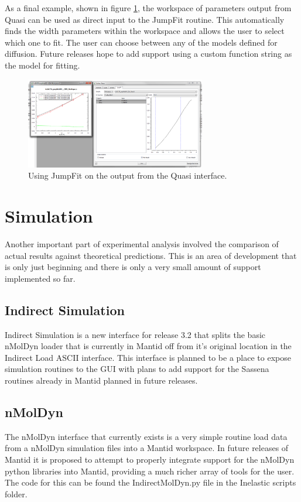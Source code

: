 \documentclass[paper=a4, fontsize=11pt]{scrartcl}	%
\numberwithin{equation}{section}															%
\numberwithin{figure}{section}																%
\numberwithin{table}{section}																%
\begin{document}
As a final example, shown in figure \ref{fig:iris-bayes-jumpfit}, the workspace of parameters output from Quasi can be used as direct input to the JumpFit routine. This automatically finds the width parameters within the workspace and allows the user to select which one to fit. The user can choose between any of the models defined for diffusion. Future releases hope to add support using a custom function string as the model for fitting.

\begin{figure}[H]
\centering
\includegraphics[width=0.7\textwidth]{img/iris-bayes-jumpfit.png}
\caption{Using JumpFit on the output from the Quasi interface.}
\label{fig:iris-bayes-jumpfit}
\end{figure}


\section{Simulation}
\label{sec:simulation}
Another important part of experimental analysis involved the comparison of actual results against theoretical predictions. This is an area of development that is only just beginning and there is only a very small amount of support implemented so far.

\subsection{Indirect Simulation}
Indirect Simulation is a new interface for release 3.2 that splits the basic nMolDyn loader that is currently in Mantid off from it's original location in the Indirect Load ASCII interface. This interface is planned to be a place to expose simulation routines to the GUI with plans to add support for the Sassena routines already in Mantid planned in future releases.

\subsection{nMolDyn}
The nMolDyn interface that currently exists is a very simple routine load data from a nMolDyn simulation files into a Mantid workspace. In future releases of Mantid it is proposed to attempt to properly integrate support for the nMolDyn python libraries into Mantid, providing a much richer array of tools for the user. The code for this can be found the IndirectMolDyn.py file in the Inelastic scripts folder.
\end{document}
